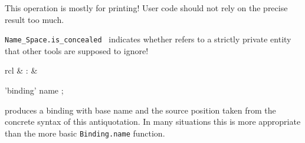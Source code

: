 \begin{isabellebody}
\begin{isamarkuptext}
\begin{description}
  This operation is mostly for printing!  User code should not rely on
  the precise result too much.

  \item \verb|Name_Space.is_concealed|~ indicates
  whether  refers to a strictly private entity that
  other tools are supposed to ignore!

  \end{description}%
\end{isamarkuptext}%
\isamarkuptrue%
%
\endisatagmlref
{\isafoldmlref}%
%
\isadelimmlref
%
\endisadelimmlref
%
\isadelimmlantiq
%
\endisadelimmlantiq
%
\isatagmlantiq
%
\begin{isamarkuptext}%
\begin{matharray}{rcl}
  \hypertarget{ML antiquotation.binding}{\hyperlink{ML antiquotation.binding}{\mbox{}}} & : &  \\
  \end{matharray}

  \begin{rail}
  'binding' name
  ;
  \end{rail}

  \begin{description}

  \item {} produces a binding with base name
   and the source position taken from the concrete
  syntax of this antiquotation.  In many situations this is more
  appropriate than the more basic \verb|Binding.name| function.


\end{description}
\end{isamarkuptext}
\end{isabellebody}
